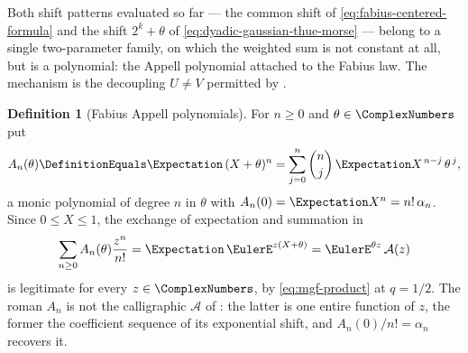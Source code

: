 \documentclass[11pt,a4paper,oneside,openany]{book}
\theoremstyle{definition}
\newtheorem{definition}[definition]{Definition}
\theoremstyle{remark}
\begin{document}

Both shift patterns evaluated so far --- the common shift of
\eqref{eq:fabius-centered-formula} and the shift $2^k+\theta$ of
\eqref{eq:dyadic-gaussian-thue-morse} --- belong to a single two-parameter
family, on which the weighted sum is not constant at all, but is a polynomial:
the Appell polynomial attached to the Fabius law.  The mechanism is the
decoupling $U\ne V$ permitted by .

\begin{definition}[Fabius Appell polynomials]\label{def:fabius-appell}
For $n\ge0$ and $\theta\in\ComplexNumbers$ put
\begin{equation}\label{eq:fabius-appell-def}
 A_n(\theta)\DefinitionEquals\Expectation\,(X+\theta)^n
 =\sum_{j=0}^{n}\binom nj\,\Expectation X^{\,n-j}\,\theta^{\,j},
\end{equation}
a monic polynomial of degree $n$ in $\theta$ with
$A_n(0)=\Expectation X^n=n!\,\alpha_n$.  Since $0\le X\le1$, the exchange of
expectation and summation in
\begin{equation}\label{eq:fabius-appell-egf}
 \sum_{n\ge0}A_n(\theta)\frac{z^n}{n!}
 =\Expectation\,\EulerE^{z(X+\theta)}
 =\EulerE^{\theta z}\,\mathcal A(z)
\end{equation}
is legitimate for every $z\in\ComplexNumbers$, by \eqref{eq:mgf-product} at $q=1/2$.  The
roman $A_n$ is not the calligraphic $\mathcal A$ of
: the latter is one entire function of $z$, the
former the coefficient sequence of its exponential shift, and
$A_n(0)/n!=\alpha_n$ recovers it.
\end{definition}
\end{document}
